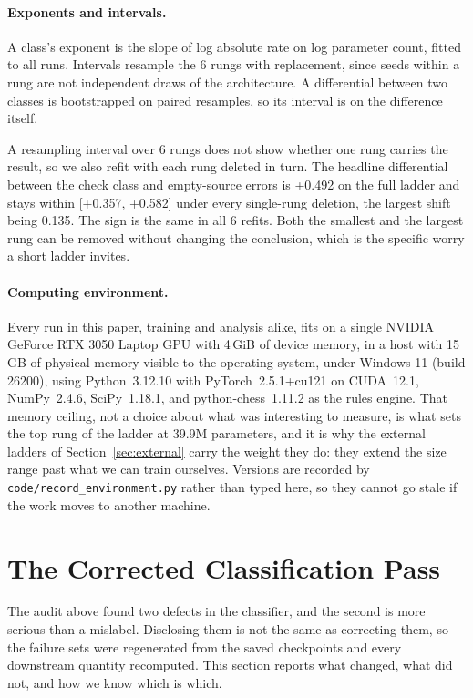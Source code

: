 \documentclass[11pt]{article}
\begin{document}
\paragraph{Exponents and intervals.}
A class's exponent is the slope of log absolute rate on log parameter count,
fitted to all runs. Intervals resample the 6 rungs with
replacement, since seeds within a rung are not independent draws of the
architecture. A differential between two classes is bootstrapped on paired
resamples, so its interval is on the difference itself.

A resampling interval over 6 rungs does not show whether one rung carries the
result, so we also refit with each rung deleted in turn. The headline differential
between the check class and empty-source errors is +0.492 on the full ladder and
stays within [+0.357, +0.582] under every single-rung deletion, the largest shift
being 0.135. The sign is the same in all 6 refits. Both the smallest and the
largest rung can be removed without changing the conclusion, which is the specific
worry a short ladder invites.

\paragraph{Computing environment.}
Every run in this paper, training and analysis alike, fits on a single
NVIDIA GeForce RTX 3050 Laptop GPU with 4\,GiB of device memory, in a host with
15\,GB of physical memory visible to the operating system, under
Windows 11 (build 26200),
using Python~3.12.10 with PyTorch~2.5.1+cu121 on
CUDA~12.1, NumPy~2.4.6, SciPy~1.18.1, and
python-chess~1.11.2 as the rules engine. That memory ceiling, not a
choice about what was interesting to measure, is what sets the top rung of the
ladder at 39.9M parameters, and it is why the external ladders of
Section~\ref{sec:external} carry the weight they do: they extend the size range
past what we can train ourselves. Versions are recorded by
\texttt{code/record\_environment.py} rather than typed here, so they cannot go
stale if the work moves to another machine.


\section{The Corrected Classification Pass}
\label{sec:regen}

The audit above found two defects in the classifier, and the second is more serious
than a mislabel. Disclosing them is not the same as correcting them, so the failure
sets were regenerated from the saved checkpoints and every downstream quantity
recomputed. This section reports what changed, what did not, and how we know which
is which.
\end{document}
